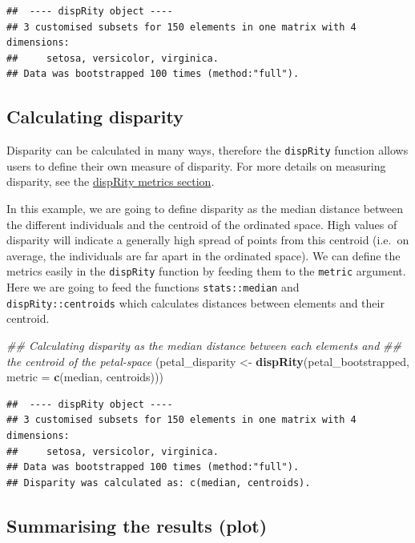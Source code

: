\documentclass[]{book}
\newenvironment{Shaded}{\begin{snugshade}}{\end{snugshade}}
\newcommand{\CommentTok}[1]{\textcolor[rgb]{0.56,0.35,0.01}{\textit{#1}}}
\newcommand{\DataTypeTok}[1]{\textcolor[rgb]{0.13,0.29,0.53}{#1}}
\newcommand{\KeywordTok}[1]{\textcolor[rgb]{0.13,0.29,0.53}{\textbf{#1}}}
\newcommand{\NormalTok}[1]{#1}
\newcommand{\StringTok}[1]{\textcolor[rgb]{0.31,0.60,0.02}{#1}}
\begin{document}
\begin{verbatim}
##  ---- dispRity object ---- 
## 3 customised subsets for 150 elements in one matrix with 4 dimensions:
##     setosa, versicolor, virginica.
## Data was bootstrapped 100 times (method:"full").
\end{verbatim}

\hypertarget{calculating-disparity}{%
\subsection{Calculating disparity}\label{calculating-disparity}}

Disparity can be calculated in many ways, therefore the \texttt{dispRity} function allows users to define their own measure of disparity.
For more details on measuring disparity, see the \protect\hyperlink{disparity-metrics}{dispRity metrics section}.

In this example, we are going to define disparity as the median distance between the different individuals and the centroid of the ordinated space.
High values of disparity will indicate a generally high spread of points from this centroid (i.e.~on average, the individuals are far apart in the ordinated space).
We can define the metrics easily in the \texttt{dispRity} function by feeding them to the \texttt{metric} argument.
Here we are going to feed the functions \texttt{stats::median} and \texttt{dispRity::centroids} which calculates distances between elements and their centroid.

\begin{Shaded}
\begin{Highlighting}[]
\CommentTok{## Calculating disparity as the median distance between each elements and}
\CommentTok{## the centroid of the petal-space}
\NormalTok{(petal_disparity <-}\StringTok{ }\KeywordTok{dispRity}\NormalTok{(petal_bootstrapped, }\DataTypeTok{metric =} \KeywordTok{c}\NormalTok{(median, centroids)))}
\end{Highlighting}
\end{Shaded}

\begin{verbatim}
##  ---- dispRity object ---- 
## 3 customised subsets for 150 elements in one matrix with 4 dimensions:
##     setosa, versicolor, virginica.
## Data was bootstrapped 100 times (method:"full").
## Disparity was calculated as: c(median, centroids).
\end{verbatim}

\hypertarget{summarising-the-results-plot}{%
\subsection{Summarising the results (plot)}\label{summarising-the-results-plot}}
\end{document}

